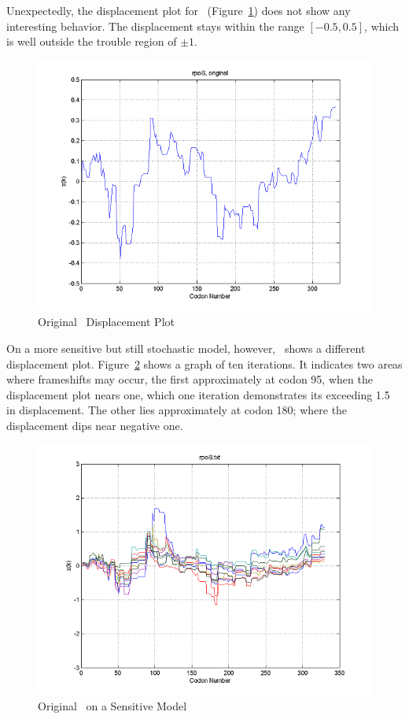 \documentclass[10pt,twocolumn]{article}
\begin{document}
Unexpectedly, the displacement plot for \rpoS\ (Figure~\ref{rpos:disp}) does not show any interesting behavior.
The displacement stays within the range $[-0.5,0.5]$, which is well outside the trouble region of $\pm 1$.

\begin{figure}[htp]
    \centering
    \caption{Original \rpoS\ Displacement Plot}
    \label{rpos:disp}
    \includegraphics[scale=0.7]{rpoS/original.png}
\end{figure}

On a more sensitive but still stochastic model, however, \rpoS\ shows a different displacement plot.  
Figure~\ref{rpos:sensdisp} shows a graph of ten iterations. It indicates two areas where frameshifts may occur,
the first approximately at codon 95, when the displacement plot nears one, which one iteration demonstrates
its exceeding 1.5 in displacement. The other lies approximately at codon 180; where the displacement dips near negative one.

\begin{figure}[htp]
    \centering
    \caption{Original \rpoS\ on a Sensitive Model}
    \label{rpos:sensdisp}
    \includegraphics[scale=0.7]{rpoS/sensitive.png}
\end{figure}
\end{document}
